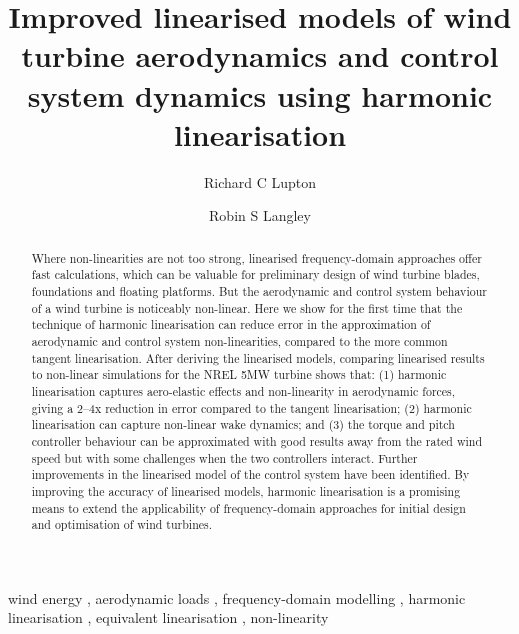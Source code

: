 \documentclass[preprint]{elsarticle}
\begin{document}
\begin{frontmatter}
  \title{Improved linearised models of wind turbine aerodynamics and control
    system dynamics using harmonic linearisation}

  \author[cued]{Richard C Lupton} 

  \author[cued]{Robin S Langley} 


  \address[cued]{Department of Engineering, University of Cambridge, Trumpington
    St, Cambridge, CB2 1PZ, UK}

  \begin{abstract}
    Where non-linearities are not too strong, linearised frequency-domain
    approaches offer fast calculations, which can be valuable for preliminary
    design of wind turbine blades, foundations and floating platforms. But the
    aerodynamic and control system behaviour of a wind turbine is noticeably
    non-linear. Here we show for the first time that the technique of harmonic
    linearisation can reduce error in the approximation of aerodynamic and
    control system non-linearities, compared to the more common tangent
    linearisation. After deriving the linearised models, comparing linearised
    results to non-linear simulations for the NREL 5MW turbine shows that: (1)
    harmonic linearisation captures aero-elastic effects and non-linearity in
    aerodynamic forces, giving a 2--4x reduction in error compared to the
    tangent linearisation; (2) harmonic linearisation can capture non-linear
    wake dynamics; and (3) the torque and pitch controller behaviour can be
    approximated with good results away from the rated wind speed but with some
    challenges when the two controllers interact. Further improvements in the
    linearised model of the control system have been identified. By improving
    the accuracy of linearised models, harmonic linearisation is a promising
    means to extend the applicability of frequency-domain approaches for initial
    design and optimisation of wind turbines.
  \end{abstract}

\begin{keyword}
  wind energy \sep
  aerodynamic loads \sep
  frequency-domain modelling \sep
  harmonic linearisation \sep
  equivalent linearisation \sep
  non-linearity
\end{keyword}
\end{frontmatter}
\end{document}
